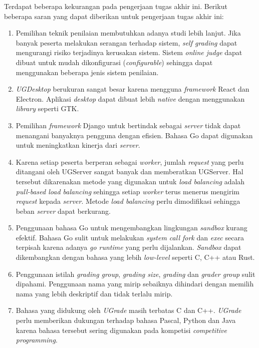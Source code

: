 \par Terdapat beberapa kekurangan pada pengerjaan tugas akhir ini. Berikut beberapa saran yang dapat diberikan untuk pengerjaan tugas akhir ini:
\begin{enumerate}
    \item Pemilihan teknik penilaian membutuhkan adanya studi lebih lanjut. Jika banyak peserta melakukan serangan terhadap sistem, \textit{self grading} dapat mengurangi risiko terjadinya kerusakan sistem. Sistem \textit{online judge} dapat dibuat untuk mudah dikonfigurasi (\textit{configurable}) sehingga dapat menggunakan beberapa jenis sistem penilaian.
    \item \textit{UGDesktop} berukuran sangat besar karena mengguna \textit{framework} React dan Electron. Aplikasi \textit{desktop} dapat dibuat lebih \textit{native} dengan menggunakan \textit{library} seperti GTK.
    \item Pemilihan \textit{framework} Django untuk bertindak sebagai \textit{server} tidak dapat menangani banyaknya pengguna dengan efisien. Bahasa Go dapat digunakan untuk meningkatkan kinerja dari \textit{server}.
    \item Karena setiap peserta berperan sebagai \textit{worker}, jumlah \textit{request} yang perlu ditangani oleh UGServer sangat banyak dan memberatkan UGServer. Hal tersebut dikarenakan metode yang digunakan untuk \textit{load balancing} adalah \textit{pull-based load balancing} sehingga setiap \textit{worker} terus menerus mengirim \textit{request} kepada \textit{server}. Metode \textit{load balancing} perlu dimodifikasi sehingga beban \textit{server} dapat berkurang.
    \item Penggunaan bahasa Go untuk mengembangkan lingkungan \textit{sandbox} kurang efektif. Bahasa Go sulit untuk melakukan \textit{system call fork} dan \textit{exec} secara terpisah karena adanya \textit{go runtime} yang perlu dijalankan. \textit{Sandbox} dapat dikembangkan dengan bahasa yang lebih \textit{low-level} seperti C, C++ atau Rust. 
    \item Penggunaan istilah \textit{grading group}, \textit{grading size}, \textit{grading} dan \textit{grader group} sulit dipahami. Penggunaan nama yang mirip sebaiknya dihindari dengan memilih nama yang lebih deskriptif dan tidak terlalu mirip. 
    \item Bahasa yang didukung oleh \textit{UGrade} masih terbatas C dan C++. \textit{UGrade} perlu memberikan dukungan terhadap bahasa Pascal, Python dan Java karena bahasa tersebut sering digunakan pada kompetisi \textit{competitive programming}.
\end{enumerate}
